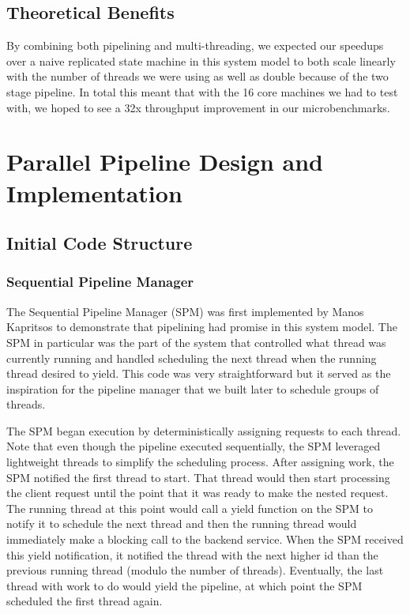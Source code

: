 \documentclass[11pt, oneside]{report}
\begin{document}
\section{Theoretical Benefits}

By combining both pipelining and multi-threading, we expected our speedups over a naive replicated state machine in this system model to both scale linearly with the number of threads we were using as well as double because of the two stage pipeline. In total this meant that with the 16 core machines we had to test with, we hoped to see a 32x throughput improvement in our microbenchmarks.

\chapter{Parallel Pipeline Design and Implementation}

\section{Initial Code Structure}

\subsection{Sequential Pipeline Manager}

The Sequential Pipeline Manager (SPM) was first implemented by Manos Kapritsos to demonstrate that pipelining had promise in this system model. The SPM in particular was the part of the system that controlled what thread was currently running and handled scheduling the next thread when the running thread desired to yield. This code was very straightforward but it served as the inspiration for the pipeline manager that we built later to schedule groups of threads.

The SPM began execution by deterministically assigning requests to each thread. Note that even though the pipeline executed sequentially, the SPM leveraged lightweight threads to simplify the scheduling process. After assigning work, the SPM notified the first thread to start. That thread would then start processing the client request until the point that it was ready to make the nested request. The running thread at this point would call a yield function on the SPM to notify it to schedule the next thread and then the running thread would immediately make a blocking call to the backend service. When the SPM received this yield notification, it notified the thread with the next higher id than the previous running thread (modulo the number of threads). Eventually, the last thread with work to do would yield the pipeline, at which point the SPM scheduled the first thread again. 
\end{document}
